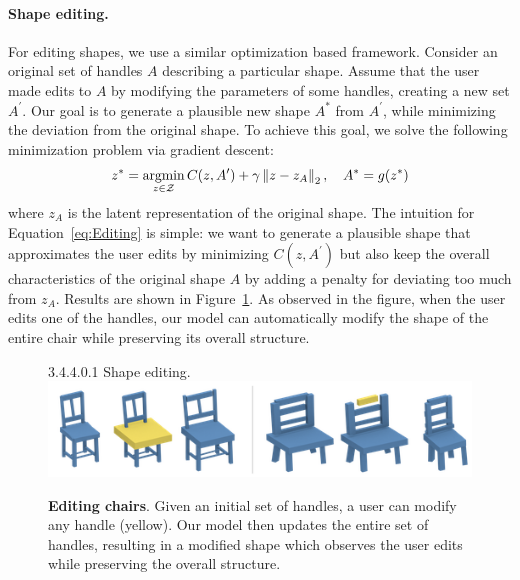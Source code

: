\paragraph*{Shape editing.}
For editing shapes, we use a similar optimization based framework.
Consider an original set of handles $A$ describing a particular shape.
Assume that the user made edits to $A$ by modifying the parameters of some handles, creating
a new set $A^\prime$.
Our goal is to generate a plausible new shape $A^*$ from $A^\prime$, while minimizing the deviation 
from the original shape.
To achieve this goal, we solve the following minimization problem via gradient descent:
\begin{equation}
   \label{eq:Editing}
   z^* = \operatorname*{argmin}_{z \in \mathcal{Z}}C(z, A^\prime) + \gamma\left\lVert z - z_A\right\rVert_2, \quad A^* = g(z^*)
\end{equation}
where $z_A$ is the latent representation of the original shape.
The intuition for Equation~\ref{eq:Editing} is simple: we want to generate a plausible shape that
approximates the user edits by minimizing  $C(z, A^\prime)$ but also keep the overall
characteristics of the original shape $A$ by adding a penalty for deviating
too much from $z_A$.
Results are shown in Figure~\ref{fig:editing}. 
As observed in the figure, when the user edits one of the handles, 
our model can automatically modify the shape of the entire chair while preserving its overall structure. 

\begin{figure}3.4.4.0.1    Shape editing.
\centering
\includegraphics[width=1.0\linewidth]{handles/imgs/editing.png}
\vspace{-20pt}
\caption{\label{fig:editing} \small
\textbf{Editing chairs}.
Given an initial set of handles, a user can modify any handle (yellow). Our model then
updates the entire set of handles, resulting in a modified shape which observes the user edits while preserving the overall structure.}
\vspace{-0.2in}
\end{figure}

